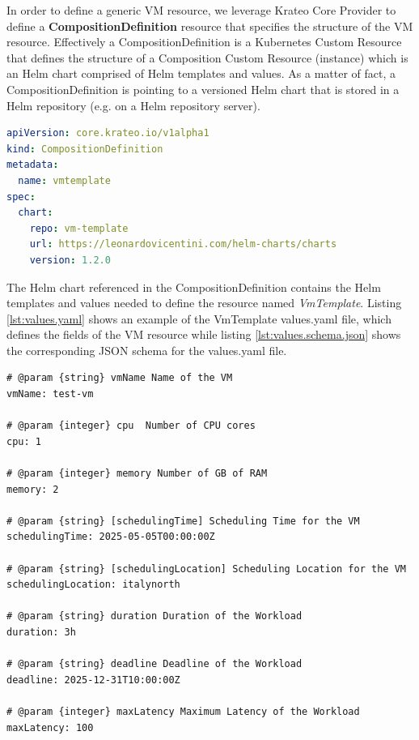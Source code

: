In order to define a generic VM resource, we leverage Krateo Core Provider to define a \textbf{CompositionDefinition} resource that specifies the structure of the VM resource.
Effectively a CompositionDefinition is a Kubernetes Custom Resource that defines the structure of a Composition Custom Resource (instance) which is an Helm chart comprised of Helm templates and values.
As a matter of fact, a CompositionDefinition is pointing to a versioned Helm chart that is stored in a Helm repository (e.g. on a Helm repository server).

\begin{lstlisting}[language=yaml, caption={CompositionDefinition}, label={lst:composition_definition}]
apiVersion: core.krateo.io/v1alpha1
kind: CompositionDefinition
metadata:
  name: vmtemplate
spec:
  chart:
    repo: vm-template
    url: https://leonardovicentini.com/helm-charts/charts
    version: 1.2.0
\end{lstlisting}

The Helm chart referenced in the CompositionDefinition contains the Helm templates and values needed to define the resource named \textit{VmTemplate}.
Listing \ref{lst:values.yaml} shows an example of the VmTemplate values.yaml file, which defines the fields of the VM resource while listing \ref{lst:values.schema.json} shows the corresponding JSON schema for the values.yaml file.

\begin{lstlisting}[language=yaml_1, caption={values.yaml}, label={lst:values.yaml}, float=htpb]
# @param {string} vmName Name of the VM
vmName: test-vm

# @param {integer} cpu  Number of CPU cores
cpu: 1

# @param {integer} memory Number of GB of RAM
memory: 2

# @param {string} [schedulingTime] Scheduling Time for the VM
schedulingTime: 2025-05-05T00:00:00Z

# @param {string} [schedulingLocation] Scheduling Location for the VM
schedulingLocation: italynorth

# @param {string} duration Duration of the Workload
duration: 3h

# @param {string} deadline Deadline of the Workload
deadline: 2025-12-31T10:00:00Z

# @param {integer} maxLatency Maximum Latency of the Workload
maxLatency: 100
\end{lstlisting}

\newpage

